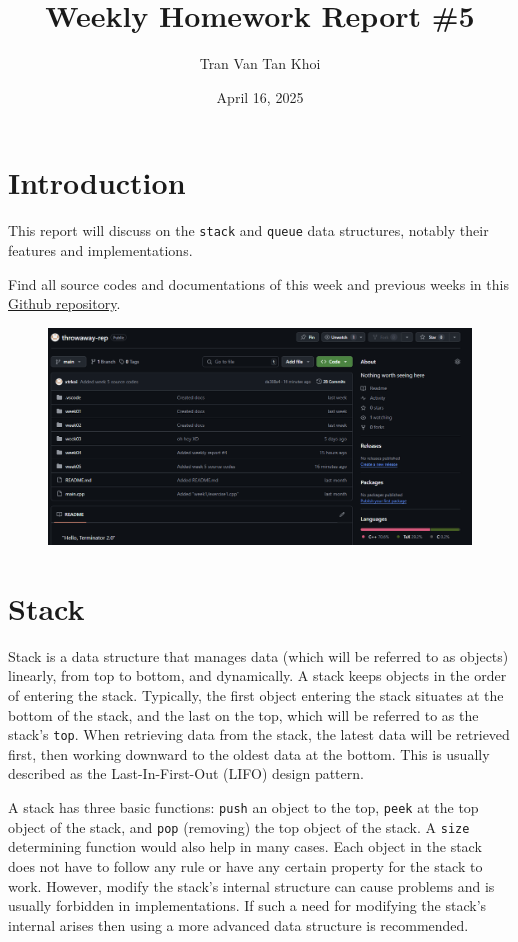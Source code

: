 \documentclass{article}
\author{Tran Van Tan Khoi}
\title{Weekly Homework Report \#5}
\date{April 16, 2025}
\begin{document}
\maketitle

\section{Introduction}
\label{introduction}

This report will discuss on the \lstinline{stack} and \lstinline{queue} data structures, notably their features and implementations.

Find all source codes and documentations of this week and previous weeks in this \href{https://github.com/xtrkoi/throwaway-rep}{Github repository}.


\begin{figure}[h]
    \centering
    \includegraphics[width=12cm]{images/image.png}
\end{figure}


\section{Stack}
\label{stack}

Stack is a data structure that manages data (which will be referred to as objects) linearly, from top to bottom, and dynamically. A stack keeps objects in the order of entering the stack. Typically, the first object entering the stack situates at the bottom of the stack, and the last on the top, which will be referred to as the stack's \lstinline{top}. When retrieving data from the stack, the latest data will be retrieved first, then working downward to the oldest data at the bottom. This is usually described as the Last-In-First-Out (LIFO) design pattern.

A stack has three basic functions: \lstinline{push} an object to the top, \lstinline{peek} at the top object of the stack, and \lstinline{pop} (removing) the top object of the stack. A \lstinline{size} determining function would also help in many cases. Each object in the stack does not have to follow any rule or have any certain property for the stack to work. However, modify the stack's internal structure can cause problems and is usually forbidden in implementations. If such a need for modifying the stack's internal arises then using a more advanced data structure is recommended.
\end{document}
